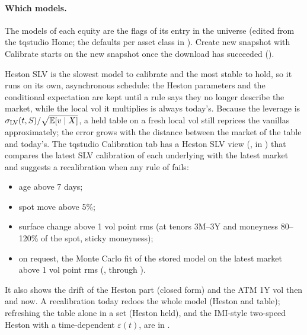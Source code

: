 \paragraph{Which models.} The models of each equity are the  flags of its entry in the universe
(edited from the tqstudio Home; the defaults per asset class in ). Create
new snapshot with Calibrate starts  on the new snapshot once the download has
succeeded ().

Heston SLV is the slowest model to calibrate and the most stable to hold, so it runs on its own, asynchronous
schedule: the Heston parameters and the conditional expectation are kept until a rule says they no longer describe
the market, while the local vol it multiplies is always today's. Because the leverage is
$\sigma_{\mathrm{LV}}(t, S)/\sqrt{\mathbb{E}[v \mid X]}$, a held table on a fresh local vol still reprices the vanillas
approximately; the error grows with the distance between the market of the table and today's. The tqstudio
Calibration tab has a Heston SLV view (,  in )
that compares the latest SLV calibration of each underlying with the latest market and suggests a recalibration
when any rule of  fails:
\begin{itemize}[nosep]
  \item age above 7 days;
  \item spot move above 5\%;
  \item surface change above 1 vol point rms (at tenors 3M--3Y and moneyness 80--120\% of the spot, sticky moneyness);
  \item on request, the Monte Carlo fit of the stored model on the latest market above 1 vol point rms
        (, through ).
\end{itemize}
It also shows the drift of the Heston part (closed form) and the ATM 1Y vol then and now. A recalibration today
redoes the whole model (Heston and table); refreshing the table alone in a set (Heston held), and the IMI-style
two-speed Heston with a time-dependent $\varepsilon(t)$, are in .

